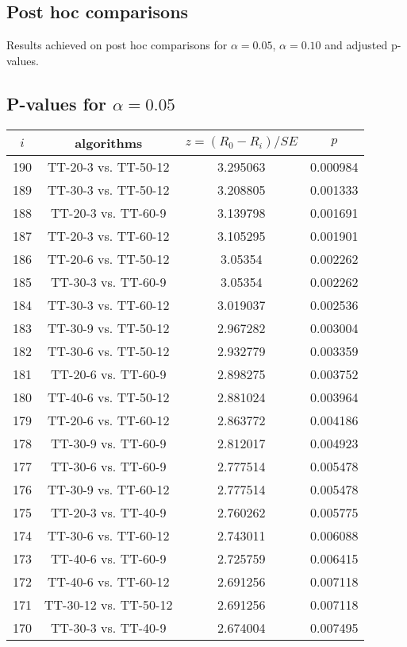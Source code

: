 \documentclass[a4paper,10pt]{article}
\begin{document}
\begin{landscape}
\pagebreak

\section{Post hoc comparisons}

Results achieved on post hoc comparisons for $\alpha = 0.05$, $\alpha = 0.10$ and adjusted p-values.

\subsection{P-values for $\alpha=0.05$}

\begin{table}[!htp]
\centering\scriptsize
\begin{tabular}{cccc}
$i$&algorithms&$z=(R_0 - R_i)/SE$&$p$\\
\hline190&TT-20-3 vs. TT-50-12&3.295063&0.000984\\
189&TT-30-3 vs. TT-50-12&3.208805&0.001333\\
188&TT-20-3 vs. TT-60-9&3.139798&0.001691\\
187&TT-20-3 vs. TT-60-12&3.105295&0.001901\\
186&TT-20-6 vs. TT-50-12&3.05354&0.002262\\
185&TT-30-3 vs. TT-60-9&3.05354&0.002262\\
184&TT-30-3 vs. TT-60-12&3.019037&0.002536\\
183&TT-30-9 vs. TT-50-12&2.967282&0.003004\\
182&TT-30-6 vs. TT-50-12&2.932779&0.003359\\
181&TT-20-6 vs. TT-60-9&2.898275&0.003752\\
180&TT-40-6 vs. TT-50-12&2.881024&0.003964\\
179&TT-20-6 vs. TT-60-12&2.863772&0.004186\\
178&TT-30-9 vs. TT-60-9&2.812017&0.004923\\
177&TT-30-6 vs. TT-60-9&2.777514&0.005478\\
176&TT-30-9 vs. TT-60-12&2.777514&0.005478\\
175&TT-20-3 vs. TT-40-9&2.760262&0.005775\\
174&TT-30-6 vs. TT-60-12&2.743011&0.006088\\
173&TT-40-6 vs. TT-60-9&2.725759&0.006415\\
172&TT-40-6 vs. TT-60-12&2.691256&0.007118\\
171&TT-30-12 vs. TT-50-12&2.691256&0.007118\\
170&TT-30-3 vs. TT-40-9&2.674004&0.007495\\

\end{tabular}
\end{table}
\end{landscape}
\end{document}
